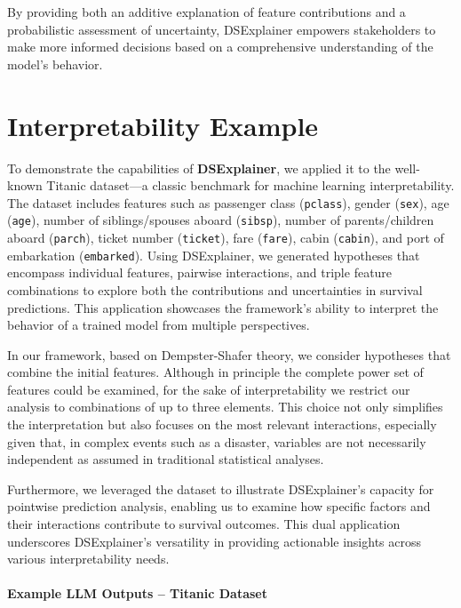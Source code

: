 \documentclass[acmlarge]{acmart}
\begin{document}
By providing both an additive explanation of feature contributions and a probabilistic assessment of uncertainty, DSExplainer empowers stakeholders to make more informed decisions based on a comprehensive understanding of the model’s behavior.
\section{Interpretability Example}
\label{sec:interpretability_example}

To demonstrate the capabilities of \textbf{DSExplainer}, we applied it to the well-known Titanic dataset—a classic benchmark for machine learning interpretability. The dataset includes features such as passenger class (\texttt{pclass}), gender (\texttt{sex}), age (\texttt{age}), number of siblings/spouses aboard (\texttt{sibsp}), number of parents/children aboard (\texttt{parch}), ticket number (\texttt{ticket}), fare (\texttt{fare}), cabin (\texttt{cabin}), and port of embarkation (\texttt{embarked}). Using DSExplainer, we generated hypotheses that encompass individual features, pairwise interactions, and triple feature combinations to explore both the contributions and uncertainties in survival predictions. This application showcases the framework's ability to interpret the behavior of a trained model from multiple perspectives.

In our framework, based on Dempster-Shafer theory, we consider hypotheses that combine the initial features. Although in principle the complete power set of features could be examined, for the sake of interpretability we restrict our analysis to combinations of up to three elements. This choice not only simplifies the interpretation but also focuses on the most relevant interactions, especially given that, in complex events such as a disaster, variables are not necessarily independent as assumed in traditional statistical analyses.

Furthermore, we leveraged the dataset to illustrate DSExplainer's capacity for pointwise prediction analysis, enabling us to examine how specific factors and their interactions contribute to survival outcomes. This dual application underscores DSExplainer's versatility in providing actionable insights across various interpretability needs.



\paragraph{Example LLM Outputs – Titanic Dataset}
\end{document}
